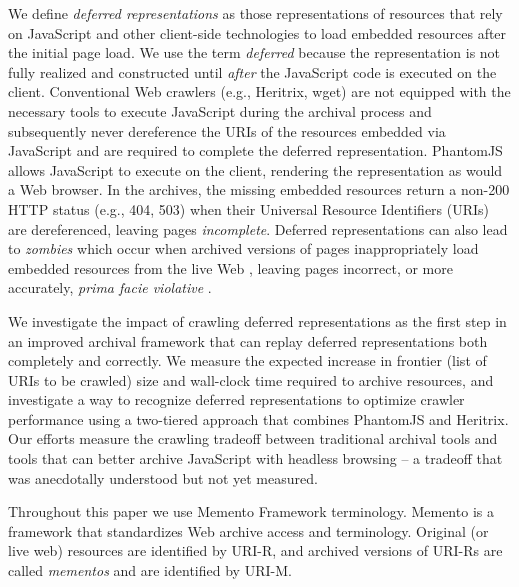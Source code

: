 \documentclass{ipres_proc_article-sp}
\begin{document}
We define \emph{deferred representations} as those representations of resources that rely on JavaScript and other client-side technologies to load embedded resources after the initial page load. We use the term \emph{deferred} because the representation is not fully realized and constructed until \emph{after} the JavaScript code is executed on the client. 
Conventional Web crawlers (e.g., Heritrix, wget) are not equipped with the necessary tools to execute JavaScript during the archival process \cite{googleJS} and subsequently never dereference the URIs of the resources embedded via JavaScript and are required to complete the deferred representation. PhantomJS allows JavaScript to execute on the client, rendering the representation as would a Web browser. In the archives, the missing embedded resources return a non-200 HTTP status (e.g., 404, 503) when their Universal Resource Identifiers (URIs) are dereferenced, leaving pages \emph{incomplete}. Deferred representations can also lead to \emph{zombies} which occur when archived versions of pages inappropriately load embedded resources from the live Web \cite{zombies}, leaving pages incorrect, or more accurately, \emph{prima facie violative} \cite{ainsworthTR}. 

We investigate the impact of crawling deferred representations as the first step in an improved archival framework that can replay deferred representations both completely and correctly. We measure the expected increase in frontier (list of URIs to be crawled) size and wall-clock time required to archive resources, and investigate a way to recognize deferred representations to optimize crawler performance using a two-tiered approach that combines PhantomJS and Heritrix. Our efforts measure the crawling tradeoff between traditional archival tools and tools that can better archive JavaScript with headless browsing -- a tradeoff that was anecdotally understood but not yet measured.

Throughout this paper we use Memento Framework terminology. Memento \cite{nelson:memento:tr} is a framework that standardizes Web archive access and terminology. Original (or live web) resources are identified by URI-R, and archived versions of URI-Rs are called \emph{mementos} and are identified by URI-M. 
\end{document}
